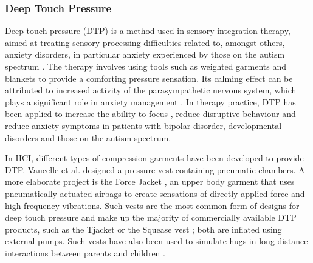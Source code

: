 \subsubsection{Deep Touch Pressure}

Deep touch pressure (DTP) is a method used in sensory integration therapy, aimed at treating sensory processing difficulties related to, amongst others, anxiety disorders, in particular anxiety experienced by those on the autism spectrum \cite{hsin-yung_chen_physiological_2013, grandin_calming_1992, krauss_effects_1987}. The therapy involves using tools such as weighted garments and blankets to provide a comforting pressure sensation. Its calming effect can be attributed to increased activity of the parasympathetic nervous system, which plays a significant role in anxiety management \cite{hsin-yung_chen_physiological_2013}. In therapy practice, DTP has been applied to increase the ability to focus \cite{fertel-daly_effects_2001}, reduce disruptive behaviour \cite{quigley_effects_2011} and reduce anxiety symptoms \cite{grandin_calming_1992} in patients with bipolar disorder, developmental disorders and those on the autism spectrum.

In HCI, different types of compression garments have been developed to provide DTP. Vaucelle et al. \cite{vaucelle_design_2009} designed a pressure vest containing pneumatic chambers. A more elaborate project is the Force Jacket \cite{delazio_force_2018}, an upper body garment that uses pneumatically-actuated airbags to create sensations of directly applied force and high frequency vibrations. Such vests are the most common form of designs for deep touch pressure and make up the majority of commercially available DTP products, such as the Tjacket \cite{ltd_tjacket_2020} or the Squease vest \cite{ltd_squease_2014}; both are inflated using external pumps. Such vests have also been used to simulate hugs in long-distance interactions between parents and children \cite{teh_huggy_2009}.


